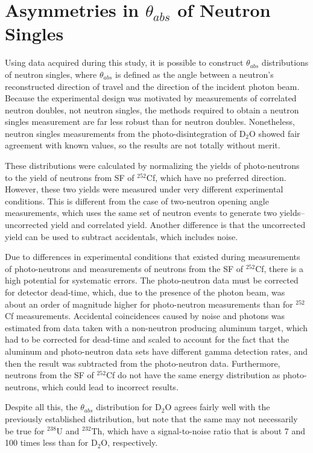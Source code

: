 \section{Asymmetries in $\theta_{abs}$ of Neutron Singles}
Using data acquired during this study, it is possible to construct $\theta_{abs}$ distributions of neutron singles, where $\theta_{abs}$ is defined as the angle between a neutron's reconstructed direction of travel and the direction of the incident photon beam.
Because the experimental design was motivated by measurements of correlated neutron doubles, not neutron singles, the methods required to obtain a neutron singles measurement are far less robust than for neutron doubles.
Nonetheless, neutron singles measurements from the photo-disintegration of D$_{2}$O showed fair agreement with known values, so the results are not totally without merit.

These distributions were calculated by normalizing the yields of photo-neutrons to the yield of neutrons from SF of $^{252}$Cf, which have no preferred direction.
However, these two yields were measured under very different experimental conditions.
This is different from the case of two-neutron opening angle measurements, which uses the same set of neutron events to generate two yields--uncorrected yield and correlated yield.
Another difference is that the uncorrected yield can be used to subtract accidentals, which includes noise.

 Due to differences in experimental conditions that existed during measurements of photo-neutrons and measurements of neutrons from the SF of $^{252}$Cf, there is a high potential for systematic errors.
The photo-neutron data must be corrected for detector dead-time, which, due to the presence of the photon beam, was about an order of magnitude higher for photo-neutron measurements than for $^{252}$Cf measurements.
Accidental coincidences caused by noise and photons was estimated from data taken with a non-neutron producing aluminum target, which had to be corrected for dead-time and scaled to account for the fact that the aluminum and photo-neutron data sets have different gamma detection rates, and then the result was subtracted from the photo-neutron data.
Furthermore, neutrons from the SF of $^{252}$Cf do not have the same energy distribution as photo-neutrons, which could lead to incorrect results.

Despite all this, the $\theta_{abs}$ distribution for D$_{2}$O agrees fairly well with the previously established distribution, but note that the same may not necessarily be true for $^{238}$U and $^{232}$Th, which have a signal-to-noise ratio that is about 7 and 100 times less than for D$_{2}$O, respectively.

